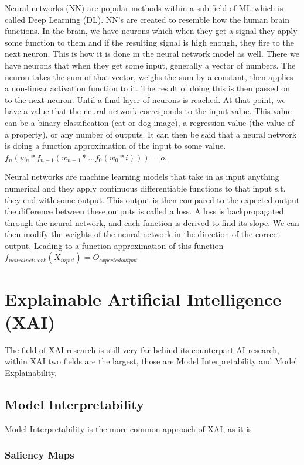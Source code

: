 Neural networks (NN) are popular methods within a sub-field of ML which is called Deep Learning (DL).
NN's are created to resemble how the human brain functions. In the brain, we have neurons which when they get a signal they apply some function to them and if the resulting signal is high enough, they fire to the next neuron. This is how it is done in the neural network model as well.
There we have neurons that when they get some input, generally a vector of numbers. The neuron takes the sum of that vector, weighs the sum by a constant, then applies a non-linear activation function to it. The result of doing this is then passed on to the next neuron. Until a final layer of neurons is reached. At that point, we have a value that the neural network corresponds to the input value. This value can be a binary classification (cat or dog image), a regression value (the value of a property), or any number of outputs. It can then be said that a neural network is doing a function approximation of the input to some value. $f_n ( w_n * f_{n-1} (w_{n-1} * \dots f_0(w_0*i))) = o$.

Neural networks are machine learning models that take in as input anything numerical and they apply continuous differentiable functions to that input s.t. they end with some output. This output is then compared to the expected output the difference between these outputs is called a loss. A loss is backpropagated through the neural network, and each function is derived to find its slope. We can then modify the weights of the neural network in the direction of the correct output. Leading to a function approximation of this function $f_{neuralnetwork}(X_{input}) = O_{expectedoutput}$

\section{Explainable Artificial Intelligence (XAI)}

The field of XAI research is still very far behind its counterpart AI research, within XAI two fields are the largest, those are Model Interpretability and Model Explainability.

\subsection{Model Interpretability}

Model Interpretability is the more common approach of XAI, as it is

\subsubsection{Saliency Maps}

